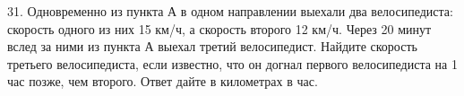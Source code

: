 31. Одновременно из пункта А в одном направлении выехали два велосипедиста: скорость одного из них 15 км/ч, а скорость второго 12 км/ч. Через 20 минут вслед за ними из пункта А выехал третий велосипедист. Найдите скорость третьего велосипедиста, если известно, что он догнал первого велосипедиста на 1 час позже, чем второго. Ответ дайте в километрах в час.\\
